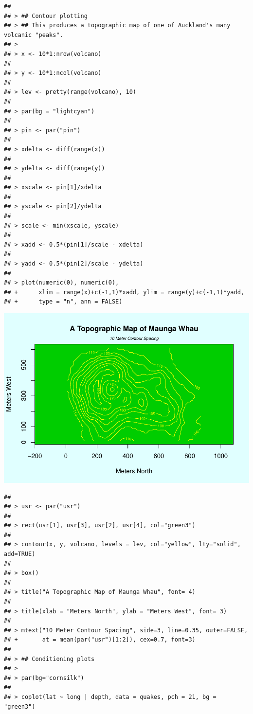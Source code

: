 \documentclass[
]{book}
\begin{document}
\begin{verbatim}
## 
## > ## Contour plotting
## > ## This produces a topographic map of one of Auckland's many volcanic "peaks".
## > 
## > x <- 10*1:nrow(volcano)
## 
## > y <- 10*1:ncol(volcano)
## 
## > lev <- pretty(range(volcano), 10)
## 
## > par(bg = "lightcyan")
## 
## > pin <- par("pin")
## 
## > xdelta <- diff(range(x))
## 
## > ydelta <- diff(range(y))
## 
## > xscale <- pin[1]/xdelta
## 
## > yscale <- pin[2]/ydelta
## 
## > scale <- min(xscale, yscale)
## 
## > xadd <- 0.5*(pin[1]/scale - xdelta)
## 
## > yadd <- 0.5*(pin[2]/scale - ydelta)
## 
## > plot(numeric(0), numeric(0),
## +      xlim = range(x)+c(-1,1)*xadd, ylim = range(y)+c(-1,1)*yadd,
## +      type = "n", ann = FALSE)
\end{verbatim}

\includegraphics{bookdown-demo_files/figure-latex/unnamed-chunk-5-10.pdf}

\begin{verbatim}
## 
## > usr <- par("usr")
## 
## > rect(usr[1], usr[3], usr[2], usr[4], col="green3")
## 
## > contour(x, y, volcano, levels = lev, col="yellow", lty="solid", add=TRUE)
## 
## > box()
## 
## > title("A Topographic Map of Maunga Whau", font= 4)
## 
## > title(xlab = "Meters North", ylab = "Meters West", font= 3)
## 
## > mtext("10 Meter Contour Spacing", side=3, line=0.35, outer=FALSE,
## +       at = mean(par("usr")[1:2]), cex=0.7, font=3)
## 
## > ## Conditioning plots
## > 
## > par(bg="cornsilk")
## 
## > coplot(lat ~ long | depth, data = quakes, pch = 21, bg = "green3")
\end{verbatim}
\end{document}
